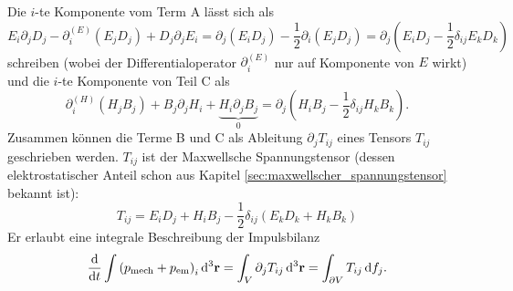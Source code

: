 Die $i$-te Komponente vom Term A lässt sich als
\begin{equation*}
	E_{i}\partial _{j}D_{j}-\partial _{i}^{\left(E\right)}\left(E_{j}D_{j}\right)+D_{j}\partial _{j}E_{i}=\partial _{j}\left(E_{i}D_{j}\right)-\frac{1}{2}\partial _{i}\left(E_{j}D_{j}\right)=\partial _{j}\left(E_{i}D_{j}-\frac{1}{2}\delta _{ij}E_{k}D_{k}\right)
\end{equation*}
schreiben (wobei der Differentialoperator $\partial _{i}^{\left(E\right)}$ nur auf Komponente von $E$ wirkt) und die $i$-te Komponente von Teil C als
\begin{equation*}
	\partial _{i}^{\left(H\right)}\left(H_{j}B_{j}\right)+B_{j}\partial _{j}H_{i}+\underset{0}{\underbrace{H_{i}\partial _{j}B_{j}}}=\partial _{j}\left(H_{i}B_{j}-\frac{1}{2}\delta _{ij}H_{k}B_{k}\right).
\end{equation*}
Zusammen können die Terme B und C als Ableitung $\partial _{j}T_{ij}$ eines Tensors $T_{ij}$ geschrieben werden. $T_{ij}$ ist der Maxwellsche Spannungstensor (dessen elektrostatischer Anteil schon aus Kapitel \ref{sec:maxwellscher_spannungstensor} bekannt ist):
\begin{equation*}
	T_{ij}=E_{i}D_{j}+H_{i}B_{j}-\frac{1}{2}\delta _{ij}\left(E_{k}D_{k}+H_{k}B_{k}\right)
\end{equation*}
Er erlaubt eine integrale Beschreibung der Impulsbilanz
\begin{equation*}
	\frac{\diff }{\diff t}\int \left(p_{\text{mech}}+p_{\mathrm{em}}\right)_{i}\diffa[3]{\vec{r}}=\int _{V}\partial _{j}T_{ij}\diffa[3]{\vec{r}}=\int _{\partial V}T_{ij}\diff f_{j}.
\end{equation*}
